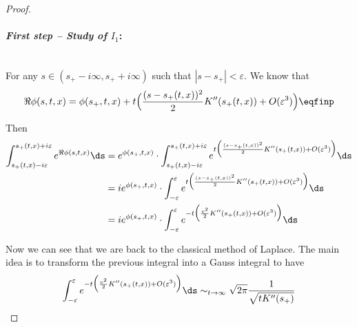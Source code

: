 \begin{proof}
\paragraph{\textit{First step -- Study of $I_1$}:}\mbox{}\\
For any $s \in (s_+ - i \infty, s_+ + i \infty)$ such that $|s - s_+| < \varepsilon$.
We know that 
    \begin{equation}
        \Re \phi(s, t, x) = \phi(s_+, t, x) + t \Big(\frac{(s - s_+(t,x))^2}{2} K''(s_+(t,x)) + O(\varepsilon^3)\Big)
        \eqfinp
    \end{equation}

Then 
\begin{align*}
   \int_{s_+(t,x) - i\varepsilon}^{s_+(t,x) + i\varepsilon} e^{\Re \phi(s,t,x)} \ds
    &=
    e^{\phi(s_+, t, x)} \cdot \int_{s_+(t,x) - i\varepsilon}^{s_+(t,x) + i\varepsilon} e^{t \Big(\frac{(s - s_+(t,x))^2}{2} K''(s_+(t,x)) + O(\varepsilon^3)\Big)} \ds \\
    &= 
     i e^{\phi(s_+, t, x)} \cdot \int_{- \varepsilon}^{\varepsilon} e^{t \Big(\frac{(s - s_+(t,x))^2}{2} K''(s_+(t,x)) + O(\varepsilon^3)\Big)} \ds \\
    &= 
     i e^{\phi(s_+, t, x)} \cdot \int_{- \varepsilon}^{\varepsilon} e^{- t \Big(\frac{v^2}{2} K''(s_+(t,x)) + O(\varepsilon^3)\Big)} \ds 
\end{align*}

Now we can see that we are back to the classical method of Laplace. The main idea is to transform the previous integral into a Gauss integral to have
    \begin{equation}
    \int_{- \varepsilon}^{\varepsilon} e^{- t \Big(\frac{v^2}{2} K''(s_+(t,x)) + O(\varepsilon^3)\Big)} \ds 
    \sim_{t \to \infty}
    \sqrt{2\pi} \frac{1}{\sqrt{tK''(s_+)}}
    \end{equation}
    

\end{proof}
